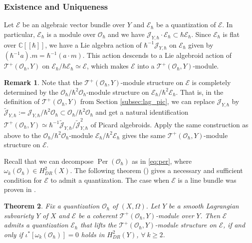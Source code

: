 \documentclass[12pt]{amsart}
\newcommand{\C}{\mathbb{C}}
\newcommand{\J}{\mathcal{J}}
\newcommand{\TT}{\mathscr{T}}
\newcommand{\tatp}{\TT^+(\Q, Y)}
\newcommand{\per}{\operatorname{Per}}
\newcommand{\OO}{\mathcal{O}}
\newcommand{\Q}{\OO_\hbar}
\newcommand{\wt}{\widetilde}
\newcommand{\EE}{\mathcal{E}}
\newtheorem{Thm}{Theorem}[subsection]
\theoremstyle{definition}
\newtheorem{Rem}[Thm]{Remark}
\numberwithin{equation}{section}
\begin{document}
\subsubsection{Existence and Uniqueness} \label{subsec:lag_vec}
Let $\EE$ be an algebraic vector bundle  over $Y$ and $\EE_\hbar$ be a quantization of $\EE$. In particular, $\EE_\hbar$ is a module over $\OO_\hbar$ and we have $\J_{Y,\hbar} \cdot \EE_\hbar \subset \hbar \EE_\hbar$. Since $\EE_\hbar$ is flat over $\C[[\hbar]]$, we have a Lie algebra action of $\hbar^{-1} \J_{Y,\hbar}$ on $\EE_\hbar$ given by $(\hbar^{-1} a). m = \hbar^{-1}(a \cdot m)$. This action descends to a Lie algebroid action of $\tatp$ on $\EE_\hbar / \hbar \EE_\hbar \simeq \EE$, which makes $\EE$ into a $\tatp$-module.


\begin{Rem} \label{rmk:pic_mod_t2}
	Note that the $\tatp$-module structure on $\EE$ is completely determined by the $\OO_\hbar / \hbar^2 \OO_\hbar$-module structure on $\EE_\hbar / \hbar^2 \EE_\hbar$. That is, in the definition of $\tatp$ from Section \ref{subsec:lag_pic}, we can replace $\J_{Y,\hbar}$ by $\wt{\J}_{Y,\hbar} := \J_{Y,\hbar} / \hbar^2 \OO_\hbar \subset \OO_\hbar / \hbar^2 \OO_\hbar$ and get a natural identification $\tatp \simeq \hbar^{-1} \wt{\J}_{Y,\hbar} / \wt{\J}^2_{Y,\hbar}$ of Picard algebroids. Apply the same construction as above to the $\OO_\hbar / \hbar^2 \OO_\hbar$-module $\EE_\hbar / \hbar^2 \EE_\hbar$ gives the same $\tatp$-module structure on $\EE$.
\end{Rem}

Recall that we can decompose $\per(\OO_\hbar)$ as in \eqref{eq:per}, where $ \omega_k(\OO_\hbar) \in H^2_{DR}(X)$. The following theorem (\cite[Thm\,1.1]{BC}) gives a necessary and sufficient condition for $\EE$ to admit a quantization. The case when $\EE$ is a line bundle was proven in \cite[Theorem 1.4]{BGKP}.

\begin{Thm}\label{thm:lag_vec}
  Fix a quantization $\OO_\hbar$ of $(X,\Omega)$. Let $Y$ be a smooth Lagrangian subvariety $Y$ of $X$ and $\EE$ be a coherent $\tatp$-module over $Y$. Then $\EE$ admits a quantization $\EE_\hbar$ that lifts the $\tatp$-module structure on $\EE$, if and only if $\iota^*[\omega_k(\OO_\hbar)] = 0$ holds in $H^2_{DR}(Y)$, $\forall ~ k \geqslant 2$.
\end{Thm}
\end{document}
